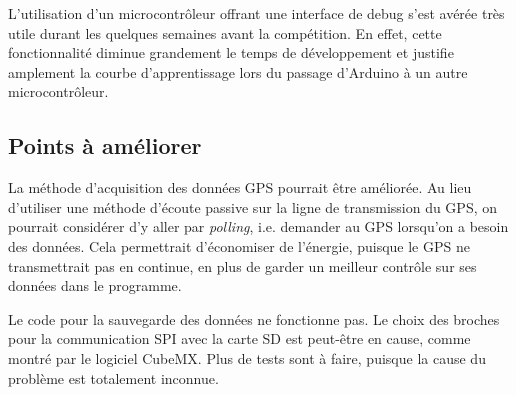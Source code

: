 L'utilisation d'un microcontrôleur offrant une interface de debug s'est avérée
très utile durant les quelques semaines avant la compétition. En effet, cette
fonctionnalité diminue grandement le temps de développement et justifie
amplement la courbe d'apprentissage lors du passage d'Arduino à un autre
microcontrôleur.

\subsection{Points à améliorer}

La méthode d'acquisition des données GPS pourrait être améliorée. Au lieu
d'utiliser une méthode d'écoute passive sur la ligne de transmission du GPS, on
pourrait considérer d'y aller par \textit{polling}, i.e. demander au GPS
lorsqu'on a besoin des données. Cela permettrait d'économiser de l'énergie,
puisque le GPS ne transmettrait pas en continue, en plus de garder un meilleur
contrôle sur ses données dans le programme.
\\
\par
Le code pour la sauvegarde des données ne fonctionne pas. Le choix des broches
pour la communication SPI avec la carte SD est peut-être en cause, comme montré
par le logiciel CubeMX. Plus de tests sont à faire, puisque la cause du
problème est totalement inconnue.
